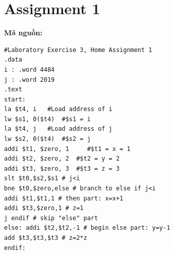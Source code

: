 \documentclass[12pt,a4paper,oneside]{article}
\begin{document}
\section{Assignment 1}
\textbf{Mã nguồn:}
\begin{center}
\begin{lstlisting}
#Laboratory Exercise 3, Home Assignment 1
.data 
i : .word 4484
j : .word 2019
.text
start:
la $t4, i	#Load address of i
lw $s1, 0($t4)	#$s1 = i 
la $t4, j	#Load address of j
lw $s2, 0($t4)	#$s2 = j
addi $t1, $zero, 1     #$t1 = x = 1
addi $t2, $zero, 2	#$t2 = y = 2
addi $t3, $zero, 3	#$t3 = z = 3
slt $t0,$s2,$s1 # j<i
bne $t0,$zero,else # branch to else if j<i
addi $t1,$t1,1 # then part: x=x+1
addi $t3,$zero,1 # z=1
j endif # skip "else" part
else: addi $t2,$t2,-1 # begin else part: y=y-1
add $t3,$t3,$t3 # z=2*z
endif:

\end{lstlisting}
\end{center}
\end{document}
